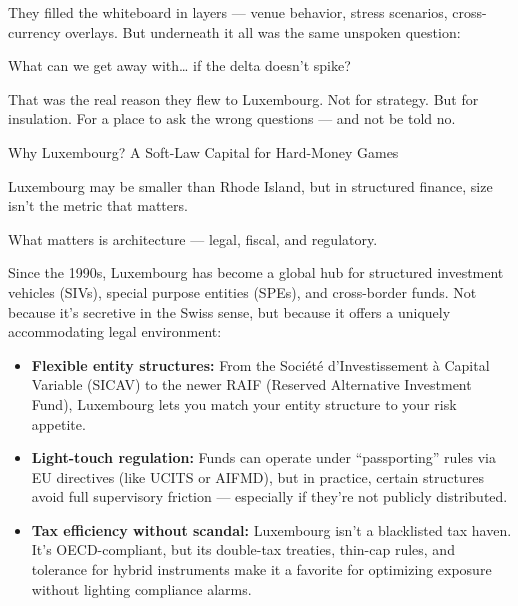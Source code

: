 They filled the whiteboard in layers — venue behavior, stress scenarios, cross-currency overlays.
But underneath it all was the same unspoken question:

What can we get away with… if the delta doesn’t spike?

That was the real reason they flew to Luxembourg.
Not for strategy.
But for insulation.
For a place to ask the wrong questions — and not be told no.

\medskip

\begin{HistoricalSidebar}{Why Luxembourg? A Soft-Law Capital for Hard-Money Games}

    Luxembourg may be smaller than Rhode Island, but in structured finance, size isn’t the metric that matters.

    \medskip
    
    What matters is architecture — legal, fiscal, and regulatory.
    
    \medskip
    
    Since the 1990s, Luxembourg has become a global hub for structured investment vehicles (SIVs), special purpose entities (SPEs), and cross-border funds. Not because it’s secretive in the Swiss sense, but because it offers a uniquely accommodating legal environment:

    \medskip
    
    \begin{itemize}
    \item \textbf{Flexible entity structures:} From the Société d’Investissement à Capital Variable (SICAV) to the newer RAIF (Reserved Alternative Investment Fund), Luxembourg lets you match your entity structure to your risk appetite.
    
    \item \textbf{Light-touch regulation:} Funds can operate under “passporting” rules via EU directives (like UCITS or AIFMD), but in practice, certain structures avoid full supervisory friction — especially if they’re not publicly distributed.
    
    \item \textbf{Tax efficiency without scandal:} Luxembourg isn’t a blacklisted tax haven. It’s OECD-compliant, but its double-tax treaties, thin-cap rules, and tolerance for hybrid instruments make it a favorite for optimizing exposure without lighting compliance alarms.
    \end{itemize}
    
    \medskip
    

\end{HistoricalSidebar}
